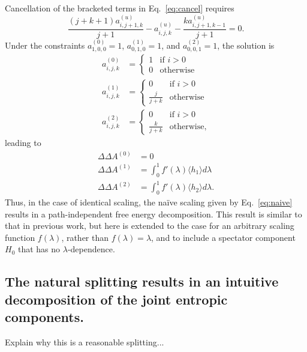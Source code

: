 \documentclass{article}
\begin{document}
Cancellation of the bracketed terms in Eq.~\ref{eq:cancel} requires
\begin{equation}
\frac
	{(j+k+1)a_{i,j+1,k}^{(u)}}
	{j+1} -
a_{i,j,k}^{(u)} -
\frac
	{k a_{i,j+1,k-1}^{(u)}}
	{j+1}
= 0.
\end{equation}
Under the constraints $a_{1,0,0}^{(0)} = 1$, $a_{0,1,0}^{(1)} = 1$, and $a_{0,0,1}^{(2)} = 1$, the solution is
\begin{align}
a_{i,j,k}^{(0)} &= \begin{cases}
    1 & \text{if $i>0$} \\
    0 & \text{otherwise}
    \end{cases}\nonumber\\
a_{i,j,k}^{(1)} &= \begin{cases}
    0 & \text{if $i>0$} \\
    \frac{j}{j+k} & \text{otherwise}
    \end{cases}\nonumber\\
a_{i,j,k}^{(2)} &= \begin{cases}
    0 & \text{if $i>0$} \\
    \frac{k}{j+k} & \text{otherwise,}
    \end{cases}
\label{eq:splitting}
\end{align}
leading to
\begin{equation}
\begin{split}
\Delta\Delta A^{(0)} &= 0 \\
\Delta\Delta A^{(1)} &= 
	\int_0^1 f'(\lambda)
    \langle h_1 \rangle 
    d\lambda \\
\Delta\Delta A^{(2)} &= 
	\int_0^1 f'(\lambda)
    \langle h_2 \rangle
    d\lambda.
\end{split}
\end{equation}
Thus, in the case of identical scaling, the na\"ive scaling given by Eq.~\ref{eq:naive} results in a path-independent free energy decomposition. This result is similar to that in previous work, but here is extended to the case for an arbitrary scaling function $f(\lambda)$, rather than $f(\lambda)=\lambda$, and to include a spectator component $H_0$ that has no $\lambda$-dependence.

\subsection{The natural splitting results in an intuitive decomposition of the joint entropic components.}

Explain why this is a reasonable splitting...
\end{document}
